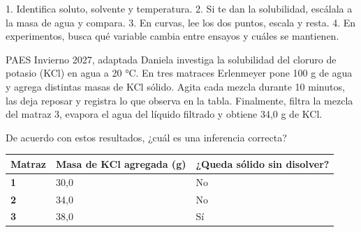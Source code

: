 \begin{clave} 1. Identifica soluto, solvente y temperatura. 2. Si te dan la solubilidad, escálala a la masa de agua y compara. 3. En curvas, lee los dos puntos, escala y resta. 4. En experimentos, busca qué variable cambia entre ensayos y cuáles se mantienen.\end{clave}
\begin{elejemplo}{PAES Invierno 2027, adaptada}
Daniela investiga la solubilidad del cloruro de potasio (KCl) en agua a 20 °C. En tres matraces Erlenmeyer pone 100 g de agua y agrega distintas masas de KCl sólido. Agita cada mezcla durante 10 minutos, las deja reposar y registra lo que observa en la tabla. Finalmente, filtra la mezcla del matraz 3, evapora el agua del líquido filtrado y obtiene 34,0 g de KCl.\par De acuerdo con estos resultados, ¿cuál es una inferencia correcta?
\begin{center}\small
\begin{tabular}{@{}lll@{}}
\toprule
\textbf{Matraz} & \textbf{Masa de KCl agregada (g)} & \textbf{¿Queda sólido sin disolver?} \\
\midrule
\textbf{1} & 30,0 & No \\
\textbf{2} & 34,0 & No \\
\textbf{3} & 38,0 & Sí \\
\bottomrule
\end{tabular}
\end{center}
\end{elejemplo}
